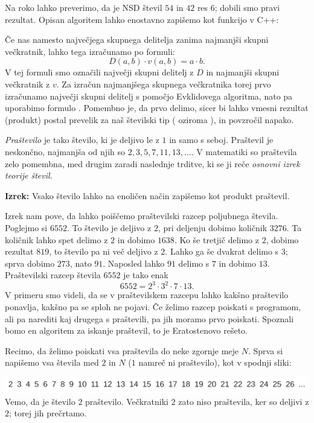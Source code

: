 Na roko lahko preverimo, da je NSD števil $54$ in $42$ res $6$; dobili smo
pravi rezultat.
Opisan algoritem lahko enostavno zapišemo kot funkcijo v C++:


Če nas namesto največjega skupnega delitelja zanima najmanjši skupni večkratnik,
lahko tega izračunamo po formuli:
\[
  D(a, b) \cdot v(a, b) = a \cdot b.
\]
V tej formuli smo označili največji skupni delitelj z $D$ in najmanjši skupni
večkratnik z $v$.
Za izračun najmanjšega skupnega večkratnika torej prvo izračunamo največji
skupni delitelj s pomočjo Evklidovega algoritma, nato pa uporabimo formulo
.
Pomembno je, da prvo delimo, sicer bi lahko vmesni rezultat (produkt) postal
prevelik za naš številski tip ( oziroma ), in
povzročil napako.


\emph{Praštevilo} je tako število, ki je deljivo le z $1$ in samo s seboj.
Praštevil je neskončno, najmanjša od njih so $2, 3, 5, 7, 11, 13, \ldots$.
V matematiki so praštevila zelo pomembna, med drugim zaradi naslednje trditve,
ki se ji reče \emph{osnovni izrek teorije števil}.

\vspace{0.5cm}

\textbf{Izrek:} Vsako število lahko na enoličen način zapišemo kot produkt
praštevil.

\noindent
Izrek nam pove, da lahko poiščemo praštevilski razcep poljubnega števila.
Poglejmo si $6552$.
To število je deljivo z $2$, pri deljenju dobimo količnik $3276$.
Ta količnik lahko spet delimo z $2$ in dobimo $1638$.
Ko še tretjič delimo z $2$, dobimo rezultat $819$, to število pa ni več
deljivo z $2$.
Lahko ga še dvakrat delimo s $3$; sprva dobimo $273$, nato $91$.
Naposled lahko $91$ delimo s $7$ in dobimo $13$.
Praštevilski razcep števila $6552$ je tako enak
\[
  6552 = 2^3 \cdot 3^2 \cdot 7 \cdot 13.
\]
V primeru smo videli, da se v praštevilskem razcepu lahko kakšno praštevilo
ponavlja, kakšno pa se sploh ne pojavi.
Če želimo razcep poiskati s programom, ali pa narediti kaj drugega s praštevili,
pa jih moramo prvo poiskati.
Spoznali bomo en algoritem za iskanje praštevil, to je Eratostenovo rešeto.

Recimo, da želimo poiskati vsa praštevila do neke zgornje meje $N$.
Sprva si napišemo vsa števila med $2$ in $N$ ($1$ namreč ni praštevilo), kot v
spodnji sliki:

\noindent
\includegraphics[width=\linewidth]{poglavja/teorija-stevil/slike/reseto1}
Vemo, da je število $2$ praštevilo.
Večkratniki $2$ zato niso praštevila, ker so deljivi z $2$; torej jih prečrtamo.

